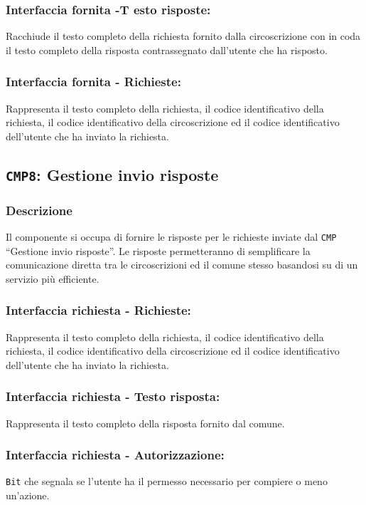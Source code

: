         \subsubsection{Interfaccia fornita -T esto risposte:}
            Racchiude il testo completo della richiesta fornito dalla circoscrizione con in coda il testo completo della risposta contrassegnato dall'utente che ha risposto.
        \subsubsection{Interfaccia fornita - Richieste:}
            Rappresenta il testo completo della richiesta, il codice identificativo della richiesta, il codice identificativo della circoscrizione ed il codice identificativo dell'utente che ha inviato la richiesta.

    \subsection{\texttt{CMP8}: Gestione invio risposte}
        \subsubsection{Descrizione}
            Il componente si occupa di fornire le risposte per le richieste inviate dal \texttt{CMP} ``Gestione invio risposte''. Le risposte permetteranno di semplificare la comunicazione diretta tra le circoscrizioni ed il comune stesso basandosi su di un servizio più efficiente.
        \subsubsection{Interfaccia richiesta - Richieste:}
            Rappresenta il testo completo della richiesta, il codice identificativo della richiesta, il codice identificativo della circoscrizione ed il codice identificativo dell'utente che ha inviato la richiesta.
        \subsubsection{Interfaccia richiesta - Testo risposta:}
            Rappresenta il testo completo della risposta fornito dal comune.
        \subsubsection{Interfaccia richiesta - Autorizzazione:}
            \texttt{Bit} che segnala se l'utente ha il permesso necessario per compiere o meno un'azione.
